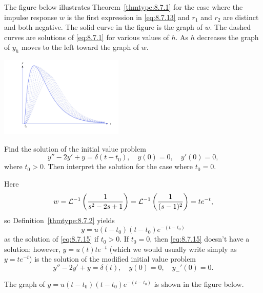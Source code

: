 \documentclass{ximera}
\begin{document}
The figure below %
illustrates Theorem~\ref{thmtype:8.7.1} for the
case where the impulse response $w$ is the first expression in
\eqref{eq:8.7.13} and $r_1$ and $r_2$ are distinct and both negative. The
solid curve in the figure is the graph of $w$. The dashed curves are
solutions of \eqref{eq:8.7.1} for various values of $h$. As $h$ decreases
the graph of $y_h$ moves to the left toward the graph of $w$.

\begin{image}
 \includegraphics[height=1.5in]{fig080702.jpg}
\end{image}



\begin{example}\label{example:8.7.1}  Find the solution of the initial
value problem
\begin{equation} \label{eq:8.7.15}
y''-2y'+y=\delta(t-t_0), \quad  y(0)=0,\quad y'(0)=0,
\end{equation}
where $t_0>0$. Then interpret the solution for the case where $t_0=0$.
\begin{explanation}
Here
$$
w={\cal L}^{-1}\left(\frac{1}{s^2-2s+1}\right)={\cal L}^{-1}\left(
\frac{1}{(s-1)^2}\right)=te^{-t},
$$
so  Definition~\ref{thmtype:8.7.2} yields
$$
y=u(t-t_0)(t-t_0)e^{-(t-t_0)}
$$
as the solution of  \eqref{eq:8.7.15} if $t_0>0$. If $t_0=0$,
then \eqref{eq:8.7.15} doesn't have a solution; however,
$y=u(t)te^{-t}$
(which we would usually write simply as $y=te^{-t}$) is the solution
of the modified initial value problem
$$
y''-2y'+y=\delta(t), \quad  y(0)=0,\quad y_-'(0)=0.
$$

The graph of $y=u(t-t_0)(t-t_0)e^{-(t-t_0)}$ is shown in
the figure below.  %
\end{explanation}
\end{example}
\end{document}
